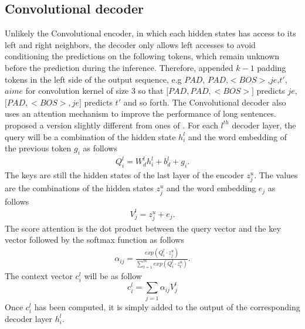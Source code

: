 \subsection{Convolutional decoder}
Unlikely the Convolutional encoder, in which each hidden states has access to its left and right neighbors, the decoder only allows left accesses to avoid conditioning the predictions on the following tokens, which remain unknown before the prediction during the inference. Therefore, \citet{Ghering17convolutional} appended $k-1$ padding tokens in the left side of the output sequence, e.g $PAD$, $PAD$,$ <BOS>$,$je$,$t'$,$aime$ for convolution kernel of size 3 so that $\big[ PAD, PAD, <BOS>\big]$ predicts $je$, $\big[ PAD,<BOS>,je\big]$ predicts $t'$ and so forth.
The Convolutional decoder also uses an attention mechanism to improve the performance of long sentences. \citet{Ghering17convolutional} proposed a version slightly different from ones of \citet{Luong15stanford, Bahdanau15learning}. For each $l^{th}$ decoder layer, the query will be a combination of the hidden state $h^l_i$ and the word embedding of the previous token $g_i$ as follows
\begin{equation}
\begin{array}{rcl}
Q^l_i = W^l_d h^l_i + b^l_d + g_i.
\end{array}
\end{equation}
The keys are still the hidden states of the last layer of the encoder $z^u_j$. The values are the combinations of the hidden states $z^u_j$ and the word embedding $e_j$ as follows
\begin{equation}
\begin{array}{rcl}
V^l_j = z^u_j + e_j.
\end{array}
\end{equation}
The score attention is the dot product between the query vector and the key vector followed by the softmax function as follows
\begin{equation}
\begin{array}{rcl}
\alpha_{ij}=\frac{exp(Q^l_i \cdot z^u_j)}{\sum_{t=1}^m exp(Q^l_i \cdot z^u_t)}.
\end{array}
\end{equation}
The context vector $c^l_i$ will be as follow
\begin{equation}
c^l_i = \sum_{j=1}\alpha_{ij}V^l_j
\end{equation}
Once $c^l_i$ has been computed, it is simply added to the output of the corresponding decoder layer $h^l_i$.
